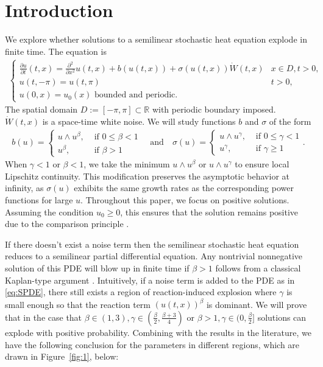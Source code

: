 \documentclass[12pt]{article}
\numberwithin{equation}{section}
\begin{document}
\section{Introduction}
We explore whether solutions to a semilinear stochastic heat equation explode in finite time. The equation is
\begin{align}
    \begin{cases}
        \frac{\partial u}{\partial t}(t,x)=\frac{\partial^2}{\partial x^2} u(t,x)+b(u(t,x))+\sigma(u(t,x))\dot{W}(t,x)  &x\in D,t>0,\\
        u(t,-\pi)=u(t,\pi) & t>0,\\
        u(0,x)=u_0(x)\text{ bounded and periodic.}
    \end{cases}\label{eq:SPDE}
\end{align}
The spatial domain $D:=[-\pi,\pi]\subset\mathbb{R}$ with periodic boundary imposed. $\dot{W}(t,x)$ is a space-time white noise. We will study  functions $b$ and $\sigma$ of the form
\begin{align}
    b(u)=\begin{cases}
        u\wedge u^{\beta}, & \text{ if } 0\leq \beta<1\\
        u^{\beta}, & \text { if } \beta>1
    \end{cases} \quad\text{and}\quad \sigma(u)=\begin{cases}
        u\wedge u^{\gamma}, & \text{ if } 0\leq \gamma<1\\
        u^{\gamma}, &\text{ if } \gamma\geq 1
    \end{cases}.\label{sec1:eq:b and sigma}
\end{align}
When  $\gamma<1$ or $\beta <1$, we take the minimum $u\wedge u^\beta$ or $u \wedge u^\gamma$  to ensure local Lipschitz continuity. This modification preserves the asymptotic behavior at infinity, as $\sigma(u)$ exhibits the same growth rates as the corresponding power functions for large $u$. Throughout this paper, we focus on positive solutions. Assuming the condition $u_0\geq 0$, this ensures that the solution remains positive due to the comparison principle \cite{Kotelenez1992,Mueller199101}.

If there doesn't exist a noise term then the semilinear stochastic heat equation reduces to a semilinear partial differential equation. Any nontrivial nonnegative solution of this PDE will blow up in finite time if $\beta>1$ follows from a classical Kaplan-type argument \cite{Kaplan}. Intuitively, if a noise term is added to the PDE as in \eqref{eq:SPDE}, there still exists a region of reaction-induced explosion where $\gamma$ is small enough so that the reaction term $(u(t,x))^{\beta}$ is dominant. We will prove that in the case that $\beta\in(1,3),\gamma\in(\frac{\beta}{2},\frac{\beta+3}{4})$ or $\beta>1,\gamma\in(0,\frac{\beta}{2}]$ solutions can explode with positive probability.  
Combining with the results in the literature, we have the following conclusion for the parameters in different regions, which are drawn in Figure~\ref{fig:1}, below:
\end{document}

